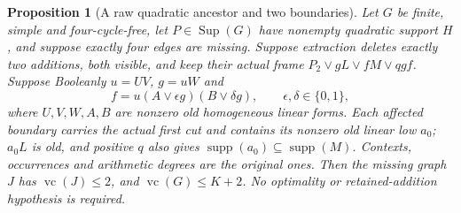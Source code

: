 \documentclass[11pt]{article}
\newcommand{\supp}{\operatorname{supp}}
\newcommand{\Sup}{\operatorname{Sup}}
\newcommand{\vc}{\operatorname{vc}}
\newtheorem{proposition}[theorem]{Proposition}
\theoremstyle{definition}
\theoremstyle{remark}
\begin{document}
\begin{proposition}[A raw quadratic ancestor and two boundaries]\label{prop:rawquadratic}
Let $G$ be finite, simple and four-cycle-free, let $P\in\Sup(G)$ have nonempty quadratic support $H$, and suppose exactly four edges are missing. Suppose extraction deletes exactly two additions, both visible, and keep their actual frame $P_2\vee gL\vee fM\vee qgf$. Suppose Booleanly $u=UV$, $g=uW$ and
\[
 f=u(A\vee\epsilon g)(B\vee\delta g),\qquad \epsilon,\delta\in\{0,1\},
\]
where $U,V,W,A,B$ are nonzero old homogeneous linear forms. Each affected boundary carries the actual first cut and contains its nonzero old linear low $a_0$; $a_0L$ is old, and positive $q$ also gives $\supp(a_0)\subseteq\supp(M)$. Contexts, occurrences and arithmetic degrees are the original ones. Then the missing graph $J$ has $\vc(J)\le2$, and $\vc(G)\le K+2$. No optimality or retained-addition hypothesis is required.
\end{proposition}
\end{document}
